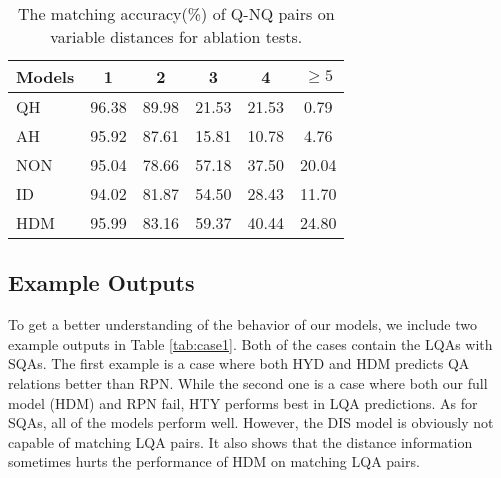 \documentclass[letterpaper]{article} %
\begin{document}
\begin{CJK}{UTF8}{gbsn}
	
	\begin{table}[h]
		\small
		\centering
		\begin{tabular}{p{1.5cm}<{\centering}ccccc}
			\toprule[1.3pt]
			Models &1&2&3&4&$\geq5$\\
			\midrule[1pt]
			QH&96.38&89.98&21.53&21.53&0.79\\
			AH&95.92&87.61&15.81&10.78&4.76\\
			\hline
			NON&95.04&78.66&57.18&37.50&20.04\\
			ID&94.02&81.87&54.50&28.43&11.70\\
			\hline
			HDM &95.99&83.16&59.37&40.44&24.80\\
			\bottomrule[1.3pt]
		\end{tabular}
		\caption{The matching accuracy(\%) of Q-NQ pairs on variable distances for ablation tests.}
		\label{tab:app2}
	\end{table}
	
	\subsection{Example Outputs}
	
	To get a better understanding of the behavior of our models, we include two example outputs in Table \ref{tab:case1}. Both of the cases contain the LQAs with SQAs. The first example is a case where both HYD and HDM predicts QA relations better than RPN. While the second one is a case where both our full model (HDM) and RPN fail, HTY performs best in LQA predictions. As for SQAs, all of the models perform well. However, the DIS model is obviously not capable of matching LQA pairs. It also shows that the distance information sometimes hurts the performance of HDM on matching LQA pairs.
	

\end{CJK}
\end{document}
